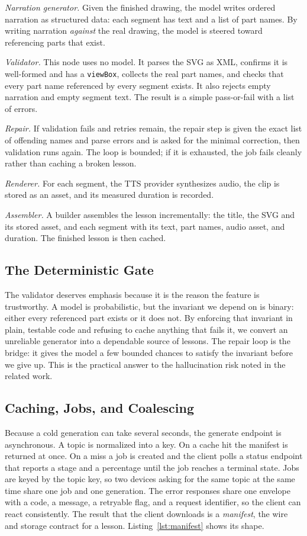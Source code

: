 \documentclass[conference]{IEEEtran}
\begin{document}
\emph{Narration generator.} Given the finished drawing, the model writes ordered
narration as structured data: each segment has text and a list of part names. By
writing narration \emph{against} the real drawing, the model is steered toward
referencing parts that exist.

\emph{Validator.} This node uses no model. It parses the SVG as XML, confirms it
is well-formed and has a \texttt{viewBox}, collects the real part names, and
checks that every part name referenced by every segment exists. It also rejects
empty narration and empty segment text. The result is a simple pass-or-fail with
a list of errors.

\emph{Repair.} If validation fails and retries remain, the repair step is given
the exact list of offending names and parse errors and is asked for the minimal
correction, then validation runs again. The loop is bounded; if it is exhausted,
the job fails cleanly rather than caching a broken lesson.

\emph{Renderer.} For each segment, the TTS provider synthesizes audio, the clip
is stored as an asset, and its measured duration is recorded.

\emph{Assembler.} A builder assembles the lesson incrementally: the title, the
SVG and its stored asset, and each segment with its text, part names, audio
asset, and duration. The finished lesson is then cached.

\subsection{The Deterministic Gate}
The validator deserves emphasis because it is the reason the feature is
trustworthy. A model is probabilistic, but the invariant we depend on is binary:
either every referenced part exists or it does not. By enforcing that invariant
in plain, testable code and refusing to cache anything that fails it, we convert
an unreliable generator into a dependable source of lessons. The repair loop is
the bridge: it gives the model a few bounded chances to satisfy the invariant
before we give up. This is the practical answer to the hallucination risk noted
in the related work.

\subsection{Caching, Jobs, and Coalescing}
Because a cold generation can take several seconds, the generate endpoint is
asynchronous. A topic is normalized into a key. On a cache hit the manifest is
returned at once. On a miss a job is created and the client polls a status
endpoint that reports a stage and a percentage until the job reaches a terminal
state. Jobs are keyed by the topic key, so two devices asking for the same topic
at the same time share one job and one generation. The error responses share one
envelope with a code, a message, a retryable flag, and a request identifier, so
the client can react consistently. The result that the client downloads is a
\emph{manifest}, the wire and storage contract for a lesson.
Listing~\ref{lst:manifest} shows its shape.
\end{document}
